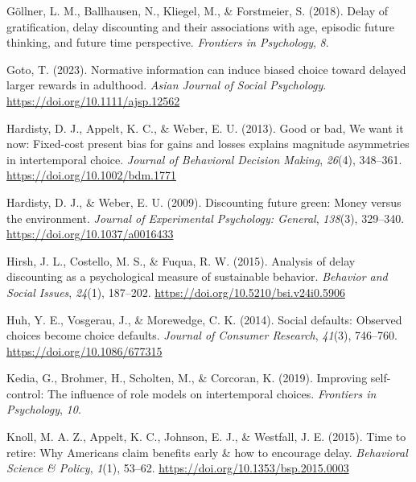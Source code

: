 \documentclass[
  pub,floatsintext]{apa6}
\newlength{\cslhangindent}
\newlength{\cslentryspacingunit} %
\newenvironment{CSLReferences}[2] %
 {%
  \setlength{\parindent}{0pt}
  \ifodd #1
  \let\oldpar\par
  \def\par{\hangindent=\cslhangindent\oldpar}
  \fi
  \setlength{\parskip}{#2\cslentryspacingunit}
 }%
 {}
\begin{document}
\begin{CSLReferences}{1}{0}
\leavevmode{}%
Göllner, L. M., Ballhausen, N., Kliegel, M., \& Forstmeier, S. (2018). Delay of gratification, delay discounting and their associations with age, episodic future thinking, and future time perspective. \emph{Frontiers in Psychology}, \emph{8}.

\leavevmode{}%
Goto, T. (2023). Normative information can induce biased choice toward delayed larger rewards in adulthood. \emph{Asian Journal of Social Psychology}. \url{https://doi.org/10.1111/ajsp.12562}

\leavevmode{}%
Hardisty, D. J., Appelt, K. C., \& Weber, E. U. (2013). Good or bad, {We} want it now: {Fixed-cost} present bias for gains and losses explains magnitude asymmetries in intertemporal choice. \emph{Journal of Behavioral Decision Making}, \emph{26}(4), 348--361. \url{https://doi.org/10.1002/bdm.1771}

\leavevmode{}%
Hardisty, D. J., \& Weber, E. U. (2009). Discounting future green: {Money} versus the environment. \emph{Journal of Experimental Psychology: General}, \emph{138}(3), 329--340. \url{https://doi.org/10.1037/a0016433}

\leavevmode{}%
Hirsh, J. L., Costello, M. S., \& Fuqua, R. W. (2015). Analysis of delay discounting as a psychological measure of sustainable behavior. \emph{Behavior and Social Issues}, \emph{24}(1), 187--202. \url{https://doi.org/10.5210/bsi.v24i0.5906}

\leavevmode{}%
Huh, Y. E., Vosgerau, J., \& Morewedge, C. K. (2014). Social defaults: {Observed} choices become choice defaults. \emph{Journal of Consumer Research}, \emph{41}(3), 746--760. \url{https://doi.org/10.1086/677315}

\leavevmode{}%
Kedia, G., Brohmer, H., Scholten, M., \& Corcoran, K. (2019). Improving self-control: {The} influence of role models on intertemporal choices. \emph{Frontiers in Psychology}, \emph{10}.

\leavevmode{}%
Knoll, M. A. Z., Appelt, K. C., Johnson, E. J., \& Westfall, J. E. (2015). Time to retire: {Why Americans} claim benefits early \& how to encourage delay. \emph{Behavioral Science \& Policy}, \emph{1}(1), 53--62. \url{https://doi.org/10.1353/bsp.2015.0003}


\end{CSLReferences}
\end{document}
